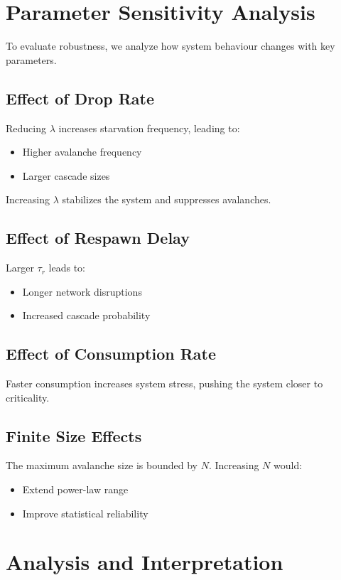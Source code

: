 \documentclass[11pt,a4paper]{article}
\begin{document}
\section{Parameter Sensitivity Analysis}

To evaluate robustness, we analyze how system behaviour changes with key parameters.

\subsection{Effect of Drop Rate}

Reducing $\lambda$ increases starvation frequency, leading to:
\begin{itemize}
\item Higher avalanche frequency
\item Larger cascade sizes
\end{itemize}

Increasing $\lambda$ stabilizes the system and suppresses avalanches.

\subsection{Effect of Respawn Delay}

Larger $\tau_r$ leads to:
\begin{itemize}
\item Longer network disruptions
\item Increased cascade probability
\end{itemize}

\subsection{Effect of Consumption Rate}

Faster consumption increases system stress, pushing the system closer to criticality.

\subsection{Finite Size Effects}

The maximum avalanche size is bounded by $N$. Increasing $N$ would:
\begin{itemize}
\item Extend power-law range
\item Improve statistical reliability
\end{itemize}
\section{Analysis and Interpretation}
\end{document}
